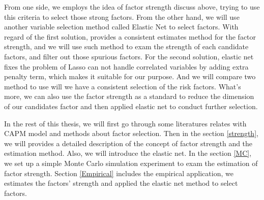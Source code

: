 From one side, we employs the idea of factor strength discuss above, trying to use this criteria to select those strong factors.
From the other hand, we will use another variable selection method called Elastic Net \cite{Zou2005} to select factors.
With regard of the first solution,  provides a consistent estimates method for the factor strength, and we will use such method to exam the strength of each candidate factors, and filter out those spurious factors.
For the second solution, elastic net fixes the problem of Lasso can not handle correlated variables by adding extra penalty term, which makes it suitable for our purpose. 
And we will compare two method to use will we have a consistent selection of the risk factors.
What's more, we can also use the factor strength as a standard to reduce the dimension of our candidates factor and then applied elastic net to conduct further selection.


In the rest of this thesis, we will first go through some literatures relates with CAPM model and methods about factor selection.
Then in the section \ref{strength}, we will provides a detailed description of the concept of factor strength and the estimation method.
Also, we will introduce the elastic net.
In the section \ref{MC}, we set up a simple Monte Carlo simulation experiment to exam the estimation of factor strength.
Section \ref{Empirical} includes the empirical application, we estimates the factors' strength and applied the elastic net method to select factors.




